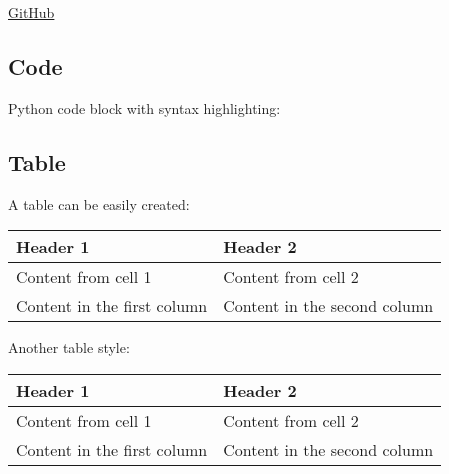 \href{http://github.com}{GitHub}

\hypertarget{code}{%
\subsection{Code}\label{code}}

Python code block with syntax highlighting:

\begin{Shaded}
\begin{Highlighting}[]
     \OperatorTok{=} 
    \NormalTok{ [}\NormalTok{,}\NormalTok{,}\NormalTok{,}\NormalTok{]:}
         \OperatorTok{+=}
     
\end{Highlighting}
\end{Shaded}

\begin{Shaded}
\begin{Highlighting}[]
\NormalTok{\{}
     \NormalTok{;}
    \NormalTok{;}
    \NormalTok{ (}
\NormalTok{    \}}
     \NormalTok{;}
\NormalTok{\}}
\end{Highlighting}
\end{Shaded}

\hypertarget{table}{%
\subsection{Table}\label{table}}

A table can be easily created:

\begin{longtable}[]{@{}ll@{}}
\toprule
Header 1 & Header 2\tabularnewline
\midrule
\endhead
Content from cell 1 & Content from cell 2\tabularnewline
Content in the first column & Content in the second
column\tabularnewline
\bottomrule
\end{longtable}

Another table style:

\begin{longtable}[]{@{}ll@{}}
\toprule
Header 1 & Header 2\tabularnewline
\midrule
\endhead
Content from cell 1 & Content from cell 2\tabularnewline
Content in the first column & Content in the second
column\tabularnewline
\bottomrule
\end{longtable}
